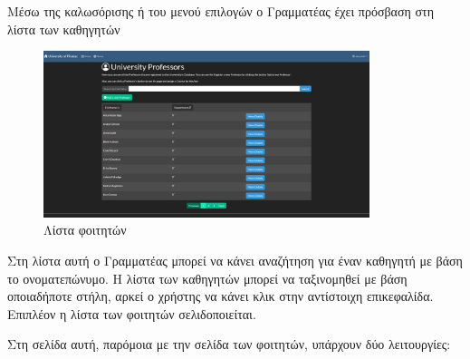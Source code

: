 \documentclass[12pt]{article}
\begin{document}
	Μέσω της καλωσόρισης ή του μενού επιλογών ο Γραμματέας έχει πρόσβαση στη λίστα των καθηγητών
	
	\begin{figure}[H]
		\centering
		\includegraphics[width=0.85\textwidth]{profs.png}
		\caption{Λίστα φοιτητών}
		\label{fig:emptyView}
	\end{figure}
	
	Στη λίστα αυτή ο Γραμματέας μπορεί να κάνει αναζήτηση για έναν καθηγητή με βάση το ονοματεπώνυμο. Η λίστα των καθηγητών μπορεί να ταξινομηθεί με βάση οποιαδήποτε στήλη, αρκεί ο χρήστης να κάνει κλικ στην αντίστοιχη επικεφαλίδα. Επιπλέον η λίστα των φοιτητών σελιδοποιείται.

		
	Στη σελίδα αυτή, παρόμοια με την σελίδα των φοιτητών, υπάρχουν δύο λειτουργίες:
	
\end{document}
